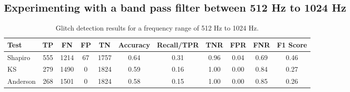 \documentclass[12pt]{article}
\begin{document}
\subsection{Experimenting with a band pass filter between 512 Hz to 1024 Hz}\label{Experiment_3}


\begin{table}[H]
  \centering
  \begin{tabular}{lcccccccccc}
  \toprule
  Test & TP & FN & FP & TN & Accuracy & Recall/TPR & TNR & FPR & FNR & F1 Score \\
  \midrule
  Shapiro & 555 & 1214 & 67 & 1757 & 0.64 & 0.31 & 0.96 & 0.04 & 0.69 & 0.46 \\
  KS & 279 & 1490 & 0 & 1824 & 0.59 & 0.16 & 1.00 & 0.00 & 0.84 & 0.27 \\
  Anderson & 268 & 1501 & 0 & 1824 & 0.58 & 0.15 & 1.00 & 0.00 & 0.85 & 0.26 \\
  \bottomrule
  \end{tabular}
  \caption{Glitch detection results for a frequency range of 512 Hz to 1024 Hz.}
  \label{tab:high_frequency_results}
\end{table}
\end{document}
